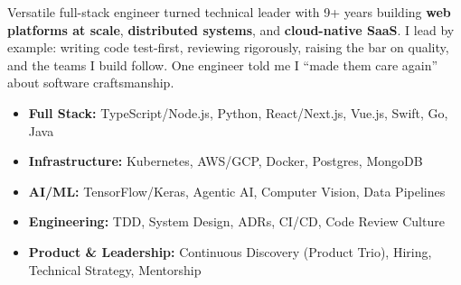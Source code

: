 \documentclass[8pt]{developercv} %
\begin{document}
    \vspace{0.5cm}

    \begin{minipage}[t]{0.45\textwidth}
        \vspace{-\baselineskip}

        Versatile full-stack engineer turned technical leader with 9+ years building \textbf{web platforms at scale}, \textbf{distributed systems}, and \textbf{cloud-native SaaS}.
        I lead by example: writing code test-first, reviewing rigorously, raising the bar on quality, and the teams I build follow.
        One engineer told me I ``made them care again'' about software craftsmanship.
    \end{minipage}
    \hfill
    \begin{minipage}[t]{0.5\textwidth}
        \vspace{-\baselineskip}
        \begin{itemize}[leftmargin=*, noitemsep, topsep=0pt, partopsep=0pt, parsep=0pt]
            \item \textbf{Full Stack:} TypeScript/Node.js, Python, React/Next.js, Vue.js, Swift, Go, Java
            \item \textbf{Infrastructure:} Kubernetes, AWS/GCP, Docker, Postgres, MongoDB
            \item \textbf{AI/ML:} TensorFlow/Keras, Agentic AI, Computer Vision, Data Pipelines
            \item \textbf{Engineering:} TDD, System Design, ADRs, CI/CD, Code Review Culture
            \item \textbf{Product \& Leadership:} Continuous Discovery (Product Trio), Hiring, Technical Strategy, Mentorship
        \end{itemize}
    \end{minipage}

    \vspace{0.4cm}


\end{document}
